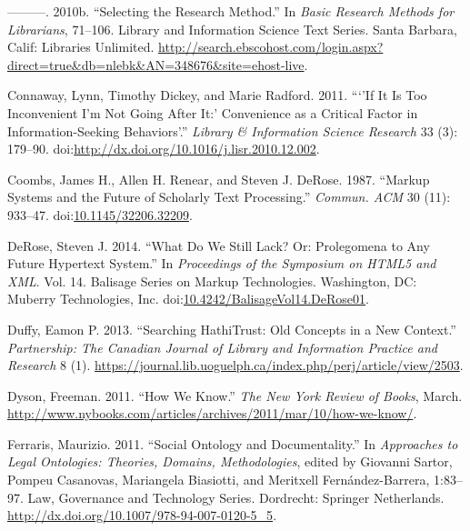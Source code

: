 \documentclass[]{article}
\begin{document}
\hypertarget{ref-connawayux5fselectingux5f2010}{}
---------. 2010b. ``Selecting the Research Method.'' In \emph{Basic
Research Methods for Librarians}, 71--106. Library and Information
Science Text Series. Santa Barbara, Calif: Libraries Unlimited.
\url{http://search.ebscohost.com/login.aspx?direct=true\&db=nlebk\&AN=348676\&site=ehost-live}.

\hypertarget{ref-connawayux5fifux5f2011}{}
Connaway, Lynn, Timothy Dickey, and Marie Radford. 2011. ```'If It Is
Too Inconvenient I'm Not Going After It:' Convenience as a Critical
Factor in Information-Seeking Behaviors'.'' \emph{Library \& Information
Science Research} 33 (3): 179--90.
doi:\href{https://doi.org/http://dx.doi.org/10.1016/j.lisr.2010.12.002}{http://dx.doi.org/10.1016/j.lisr.2010.12.002}.

\hypertarget{ref-coombsux5fmarkupux5f1987}{}
Coombs, James H., Allen H. Renear, and Steven J. DeRose. 1987. ``Markup
Systems and the Future of Scholarly Text Processing.'' \emph{Commun.
ACM} 30 (11): 933--47.
doi:\href{https://doi.org/10.1145/32206.32209}{10.1145/32206.32209}.

\hypertarget{ref-deroseux5fwhatux5f2014}{}
DeRose, Steven J. 2014. ``What Do We Still Lack? Or: Prolegomena to Any
Future Hypertext System.'' In \emph{Proceedings of the Symposium on
HTML5 and XML}. Vol. 14. Balisage Series on Markup Technologies.
Washington, DC: Muberry Technologies, Inc.
doi:\href{https://doi.org/10.4242/BalisageVol14.DeRose01}{10.4242/BalisageVol14.DeRose01}.

\hypertarget{ref-duffyux5fsearchingux5f2013}{}
Duffy, Eamon P. 2013. ``Searching HathiTrust: Old Concepts in a New
Context.'' \emph{Partnership: The Canadian Journal of Library and
Information Practice and Research} 8 (1).
\url{https://journal.lib.uoguelph.ca/index.php/perj/article/view/2503}.

\hypertarget{ref-dysonux5fhowux5f2011}{}
Dyson, Freeman. 2011. ``How We Know.'' \emph{The New York Review of
Books}, March.
\url{http://www.nybooks.com/articles/archives/2011/mar/10/how-we-know/}.

\hypertarget{ref-ferrarisux5fsocialux5f2011}{}
Ferraris, Maurizio. 2011. ``Social Ontology and Documentality.'' In
\emph{Approaches to Legal Ontologies: Theories, Domains, Methodologies},
edited by Giovanni Sartor, Pompeu Casanovas, Mariangela Biasiotti, and
Meritxell Fernández-Barrera, 1:83--97. Law, Governance and Technology
Series. Dordrecht: Springer Netherlands.
\url{http://dx.doi.org/10.1007/978-94-007-0120-5_5}.
\end{document}
